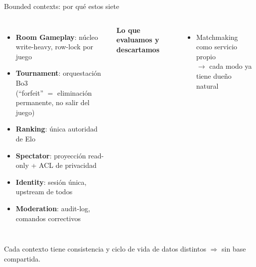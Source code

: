 \documentclass[aspectratio=169,10pt]{beamer}
\begin{document}
\begin{frame}{Bounded contexts: por qué estos siete}
  \small
  \begin{columns}[T]
      \begin{itemize}
        \item \textbf{Room Gameplay}: núcleo write-heavy, row-lock por juego
        \item \textbf{Tournament}: orquestación Bo3\\
              {\scriptsize (``forfeit'' $=$ eliminación permanente, no salir del juego)}
        \item \textbf{Ranking}: única autoridad de Elo
        \item \textbf{Spectator}: proyección read-only + \alert{ACL de privacidad}
        \item \textbf{Identity}: sesión única, upstream de todos
        \item \textbf{Moderation}: audit-log, comandos correctivos
      \end{itemize}
      \textbf{Lo que evaluamos y descartamos}
      \begin{itemize}
        \item Matchmaking como servicio propio \\
              {\scriptsize $\to$ cada modo ya tiene dueño natural}
      \end{itemize}
  \end{columns}
  \vfill
  \centering\scriptsize\color{cGrey}
  Cada contexto tiene consistencia y ciclo de vida de datos distintos $\Rightarrow$ sin base compartida.
\end{frame}
\end{document}
